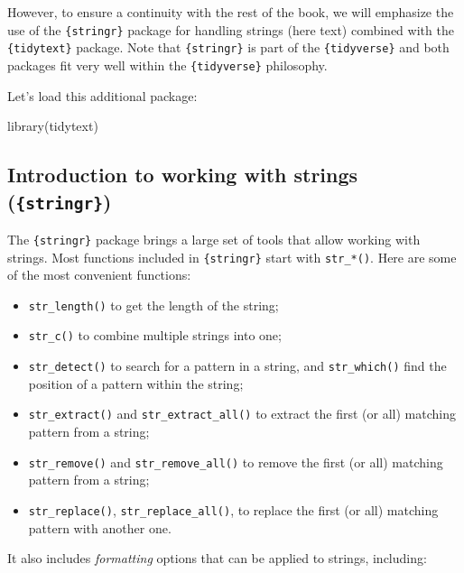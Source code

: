\documentclass[
]{krantz}
\makeatletter
\newenvironment{Shaded}{\begin{snugshade}}{\end{snugshade}}
\newcommand{\FunctionTok}[1]{\textcolor[rgb]{0,0,0}{#1}}
\newcommand{\NormalTok}[1]{#1}
\providecommand{\tightlist}{%
  \setlength{\itemsep}{0pt}\setlength{\parskip}{0pt}}
\newenvironment{kframe}{%
\medskip{}
\setlength{\fboxsep}{.8em}
 \def\at@end@of@kframe{}%
 \ifinner\ifhmode%
  \def\at@end@of@kframe{\end{minipage}}%
  \begin{minipage}{\columnwidth}%
 \fi\fi%
 \def\FrameCommand##1{\hskip\@totalleftmargin \hskip-\fboxsep
 \colorbox{shadecolor}{##1}\hskip-\fboxsep
     \hskip-\linewidth \hskip-\@totalleftmargin \hskip\columnwidth}%
 \MakeFramed {\advance\hsize-\width
   \@totalleftmargin\z@ \linewidth\hsize
   \@setminipage}}%
 {\par\unskip\endMakeFramed%
 \at@end@of@kframe}
\renewenvironment{Shaded}{\begin{kframe}}{\end{kframe}}
\makeatother
\begin{document}
However, to ensure a continuity with the rest of the book, we will emphasize the use of the \texttt{\{stringr\}} package for handling strings (here text) combined with the \texttt{\{tidytext\}} package. Note that \texttt{\{stringr\}} is part of the \texttt{\{tidyverse\}} and both packages fit very well within the \texttt{\{tidyverse\}} philosophy.

Let's load this additional package:

\begin{Shaded}
\begin{Highlighting}[]
\FunctionTok{library}\NormalTok{(tidytext)}
\end{Highlighting}
\end{Shaded}

\hypertarget{introduction-to-working-with-strings-stringr}{%
\subsection{\texorpdfstring{Introduction to working with strings (\texttt{\{stringr\}})}{Introduction to working with strings (\{stringr\})}}\label{introduction-to-working-with-strings-stringr}}

The \texttt{\{stringr\}} package brings a large set of tools that allow working with strings. Most functions included in \texttt{\{stringr\}} start with \texttt{str\_*()}. Here are some of the most convenient functions:

\begin{itemize}
\tightlist
\item
  \texttt{str\_length()} to get the length of the string;
\item
  \texttt{str\_c()} to combine multiple strings into one;
\item
  \texttt{str\_detect()} to search for a pattern in a string, and \texttt{str\_which()} find the position of a pattern within the string;
\item
  \texttt{str\_extract()} and \texttt{str\_extract\_all()} to extract the first (or all) matching pattern from a string;
\item
  \texttt{str\_remove()} and \texttt{str\_remove\_all()} to remove the first (or all) matching pattern from a string;
\item
  \texttt{str\_replace()}, \texttt{str\_replace\_all()}, to replace the first (or all) matching pattern with another one.
\end{itemize}

It also includes \emph{formatting} options that can be applied to strings, including:
\end{document}
